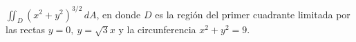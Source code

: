 \item $\iint_D (x^2 + y^2)^{3/2} \, dA$, en donde $D$ es la región del primer cuadrante limitada por las rectas $y = 0, \ y = \sqrt{3}x$ y la circunferencia $x^2 + y^2 = 9$.
